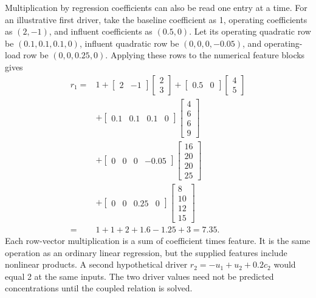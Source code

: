 Multiplication by regression coefficients can also be read one entry at a time. For an illustrative first driver, take the baseline coefficient as 1, operating coefficients as \((2,-1)\), and influent coefficients as \((0.5,0)\). Let its operating quadratic row be \((0.1,0.1,0.1,0)\), influent quadratic row be \((0,0,0,-0.05)\), and operating-load row be \((0,0,0.25,0)\). Applying these rows to the numerical feature blocks gives
\begin{equation}
\label{eq:icsor_driver_multiplication_example}
\begin{aligned}
r_1={}&1+\begin{bmatrix}2&-1\end{bmatrix}\begin{bmatrix}2\\3\end{bmatrix}
+\begin{bmatrix}0.5&0\end{bmatrix}\begin{bmatrix}4\\5\end{bmatrix}\\
&+\begin{bmatrix}0.1&0.1&0.1&0\end{bmatrix}\begin{bmatrix}4\\6\\6\\9\end{bmatrix}\\
&+\begin{bmatrix}0&0&0&-0.05\end{bmatrix}\begin{bmatrix}16\\20\\20\\25\end{bmatrix}\\
&+\begin{bmatrix}0&0&0.25&0\end{bmatrix}\begin{bmatrix}8\\10\\12\\15\end{bmatrix}\\
={}&1+1+2+1.6-1.25+3=7.35.
\end{aligned}
\end{equation}
Each row-vector multiplication is a sum of coefficient times feature. It is the same operation as an ordinary linear regression, but the supplied features include nonlinear products. A second hypothetical driver \(r_2=-u_1+u_2+0.2c_2\) would equal 2 at the same inputs. The two driver values need not be predicted concentrations until the coupled relation is solved.

